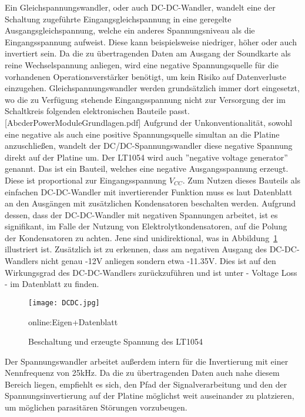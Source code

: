 Ein Gleichspannungswandler, oder auch DC-DC-Wandler, wandelt eine der Schaltung zugeführte Eingangsgleichspannung in eine geregelte Ausgangsgleichspannung, welche ein anderes Spannungsniveau als die Eingangsspannung aufweist. Diese kann beispielsweise niedriger, höher oder auch invertiert sein.
Da die zu übertragenden Daten am Ausgang der Soundkarte als reine Wechselspannung anliegen, wird eine negative Spannungsquelle für die vorhandenen Operationsverstärker benötigt, um kein Risiko auf Datenverluste einzugehen.
Gleichspannungswandler werden grundsätzlich immer dort eingesetzt, wo die zu Verfügung stehende Eingangsspannung nicht zur Versorgung der im Schaltkreis folgenden elektronischen Bauteile passt.[AbcderPowerModuleGrundlagen.pdf] Aufgrund der Unkonventionalität, sowohl eine negative als auch eine positive Spannungsquelle simultan an die Platine anzuschließen, wandelt der DC/DC-Spannungswandler diese negative Spannung direkt auf der Platine um. Der LT1054 wird auch ”negative voltage generator” genannt. Das ist ein Bauteil, welches eine negative Ausgangsspannung erzeugt. Diese ist proportional zur Eingangsspannung $V_{CC}$. Zum Nutzen dieses Bauteils als einfachen DC-DC-Wandler mit invertierender Funktion muss es laut Datenblatt an den Ausgängen mit zusätzlichen Kondensatoren beschalten werden. Aufgrund dessen, dass der DC-DC-Wandler mit negativen Spannungen arbeitet, ist es signifikant, im Falle der Nutzung von Elektrolytkondensatoren, auf die Polung der Kondensatoren zu achten. Jene sind unidirektional, was in Abbildung~\ref{fig:DCDC} illustriert ist. Zusätzlich ist zu erkennen, dass am negativen Ausgang des DC-DC-Wandlers nicht genau -12V anliegen sondern etwa -11.35V. Dies ist auf den Wirkungsgrad des DC-DC-Wandlers zurückzuführen und ist unter - Voltage Loss - im Datenblatt zu finden. 

\begin{figure}[H]
	\centering
	\texttt{[image: DCDC.jpg]}
	\caption[Beschaltung und erzeugte Spannung des LT1054]{Beschaltung und erzeugte Spannung des LT1054} 
	\gls{online:Eigen}+Datenblatt
	\label{fig:DCDC}
\end{figure}

Der Spannungswandler arbeitet außerdem intern für die Invertierung mit einer Nennfrequenz von 25kHz. Da die zu übertragenden Daten auch nahe diesem Bereich liegen, empfiehlt es sich, den Pfad der Signalverarbeitung und den der Spannungsinvertierung auf der Platine möglichst weit auseinander zu platzieren, um möglichen parasitären Störungen vorzubeugen.


